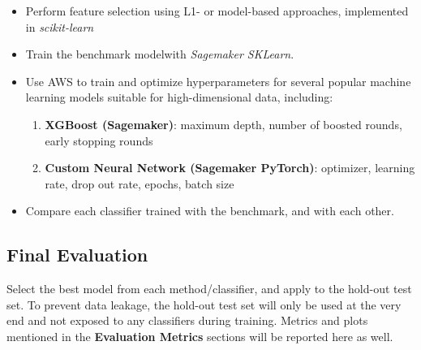 \documentclass[11pt]{diazessay}
\begin{document}
\begin{itemize}
	\item Perform feature selection using L1- or model-based approaches, implemented in \textit{scikit-learn}
	\item Train the benchmark modelwith \textit{Sagemaker SKLearn}.
	\item Use AWS to train and optimize hyperparameters for several popular machine learning models suitable for high-dimensional data, including: 
	\begin{enumerate}
		\item \textbf{XGBoost (Sagemaker)}: maximum depth, number of boosted rounds, early stopping rounds
		\item \textbf{Custom Neural Network (Sagemaker PyTorch)}: optimizer, learning rate, drop out rate, epochs, batch size
	\end{enumerate}
	\item Compare each classifier trained with the benchmark, and with each other.
\end{itemize} 

\subsection{Final Evaluation}

Select the best model from each method/classifier, and apply to the hold-out test set. To prevent data leakage, the hold-out test set will only be used at the very end and not exposed to any classifiers during training. Metrics and plots mentioned in the \textbf{Evaluation Metrics} sections will be reported here as well.

\vskip0.4in



\end{document}
